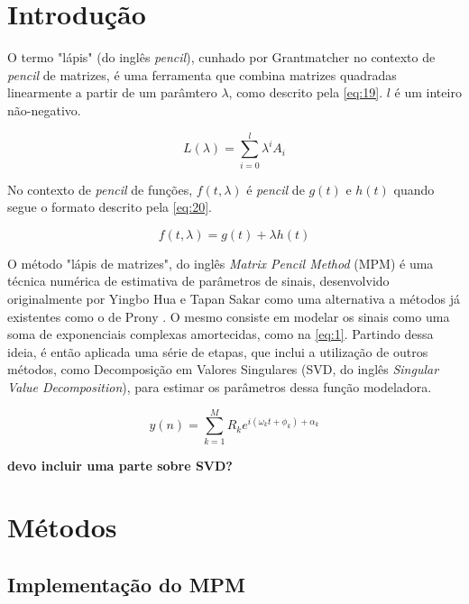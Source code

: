 \documentclass[12pt]{article}
\begin{document}
\section{Introdução}

O termo "lápis" (do inglês \textit{pencil}), cunhado por Grantmatcher \cite{} no contexto de \textit{pencil} de matrizes, é uma ferramenta que combina matrizes 
quadradas linearmente a partir de um parâmtero $\lambda$, como descrito pela \autoref{eq:19}. $l$ é um inteiro não-negativo.

\begin{equation} \label{eq:19}
    L(\lambda) = \sum_{i = 0}^{l} \lambda^i A_i
\end{equation}

No contexto de \textit{pencil} de funções, $f(t, \lambda)$ é \textit{pencil} de $g(t)$ e $h(t)$ quando segue o formato descrito pela \autoref{eq:20}.

\begin{equation} \label{eq:20}
    f(t, \lambda) = g(t) + \lambda h(t)
\end{equation}

O método "lápis de matrizes", do inglês \textit{Matrix Pencil Method} (MPM) é uma técnica numérica
de estimativa de parâmetros de sinais, desenvolvido originalmente por Yingbo Hua e Tapan Sakar \cite{370583} como uma alternativa a métodos já existentes 
como o de Prony \cite{49090}. O mesmo consiste em modelar os sinais como uma soma de exponenciais complexas amortecidas, como na \autoref{eq:1}. Partindo 
dessa ideia, é então aplicada uma série de etapas, que inclui a utilização de outros métodos, como Decomposição em Valores Singulares (SVD, do inglês \textit{Singular Value Decomposition}), 
para estimar os parâmetros dessa função modeladora.  

\begin{equation} \label{eq:1}
    y(n) = \sum_{k=1}^{M} R_k e^{i (\omega_k t + \phi_k) + \alpha_k }
\end{equation}

\textbf{devo incluir uma parte sobre SVD?}

\section{Métodos}

\subsection{Implementação do MPM} \label{sec:implement-mpm}
\end{document}
